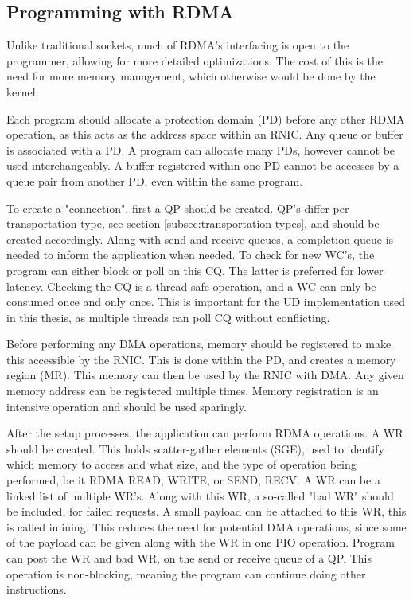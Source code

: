 \subsection{Programming with RDMA}\label{subsec:programming-with-rdma}
Unlike traditional sockets, much of RDMA's interfacing is open to the programmer, allowing for more detailed optimizations.
The cost of this is the need for more memory management, which otherwise would be done by the kernel.

Each program should allocate a protection domain (PD) before any other RDMA operation, as this acts as the address space within an RNIC.
Any queue or buffer is associated with a PD.
A program can allocate many PDs, however cannot be used interchangeably.
A buffer registered within one PD cannot be accesses by a queue pair from another PD, even within the same program.

To create a "connection", first a QP should be created.
QP's differ per transportation type, see section \ref{subsec:transportation-types}, and should be created accordingly.
Along with send and receive queues, a completion queue is needed to inform the application when needed.
To check for new WC's, the program can either block or poll on this CQ.
The latter is preferred for lower latency.
Checking the CQ is a thread safe operation, and a WC can only be consumed once and only once.
This is important for the UD implementation used in this thesis, as multiple threads can poll CQ without conflicting.

Before performing any DMA operations, memory should be registered to make this accessible by the RNIC.
This is done within the PD, and creates a memory region (MR).
This memory can then be used by the RNIC with DMA.
Any given memory address can be registered multiple times.
Memory registration is an intensive operation and should be used sparingly.

After the setup processes, the application can perform RDMA operations.
A WR should be created.
This holds scatter-gather elements (SGE), used to identify which memory to access and what size, and the type of operation being performed, be it RDMA READ, WRITE, or SEND, RECV.
A WR can be a linked list of multiple WR's.
Along with this WR, a so-called "bad WR" should be included, for failed requests.
A small payload can be attached to this WR, this is called inlining.
This reduces the need for potential DMA operations, since some of the payload can be given along with the WR in one PIO operation.
Program can post the WR and bad WR, on the send or receive queue of a QP.
This operation is non-blocking, meaning the program can continue doing other instructions.

